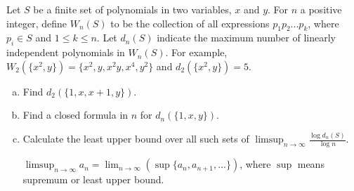 Let $S$ be a finite set of polynomials in two variables, $x$ and $y$. For $n$ a
positive integer, define $W_n(S)$ to be the collection of all expressions
$p_1 p_2 ... p_k$, where $p_i \in S$ and $1 \le k \le n$. Let $d_n(S)$ indicate
the maximum number of linearly independent polynomials in $W_n(S)$. For example,
$W_2(\lbrace x^2, y \rbrace) = \lbrace x^2, y, x^2 y, x^4, y^2 \rbrace$ and
$d_2(\lbrace x^2, y \rbrace) = 5$.

\begin{enumerate}[(a)]
\item Find $d_2(\lbrace 1, x, x + 1, y \rbrace)$.

\item Find a closed formula in $n$ for $d_n(\lbrace 1, x, y \rbrace)$.

\item Calculate the least upper bound over all such sets of
      $\displaystyle{ \limsup_{n \to \infty} \frac{\log d_n(S)}{\log n} }$.

      $\displaystyle{
          \limsup_{n \to \infty} a_n =
          \lim_{n \to \infty}(\sup \lbrace a_n, a_{n + 1},... \rbrace)
      }$, where $\sup$ means supremum or least upper bound.
\end{enumerate}
